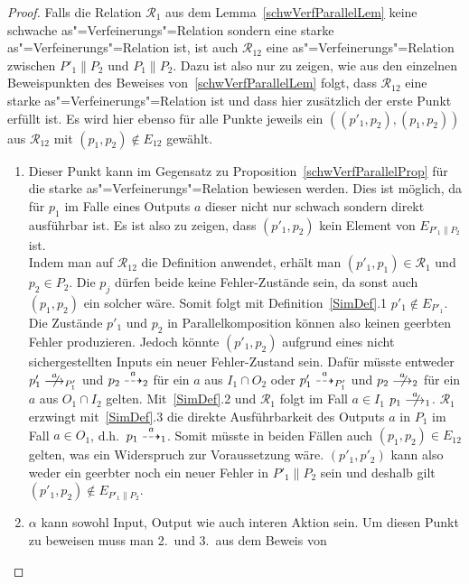 \begin{proof}
  Falls die Relation $\mathcal{R}_1$ aus dem Lemma~\ref{schwVerfParallelLem}
  keine schwache as"=Verfeinerungs"=Relation sondern eine starke
  as"=Verfeinerungs"=Relation ist, ist auch $\mathcal{R}_{12}$ eine
  as"=Verfeinerungs"=Relation zwischen $P'_1\|P_2$ und $P_1\|P_2$. Dazu ist
  also nur zu zeigen, wie aus den einzelnen Beweispunkten des Beweises
  von~\ref{schwVerfParallelLem} folgt, dass $\mathcal{R}_{12}$ eine starke
  as"=Verfeinerungs"=Relation ist und dass hier zusätzlich der erste Punkt
  erfüllt ist. Es wird hier ebenso für alle Punkte jeweils ein
  $((p'_1,p_2),(p_1,p_2))$ aus $\mathcal{R}_{12}$ mit $(p_1,p_2)\notin E_{12}$
  gewählt.
  \begin{enumerate}
    \item Dieser Punkt kann im Gegensatz zu
      Proposition~\ref{schwVerfParallelProp} für die starke
      as"=Verfeinerungs"=Relation bewiesen werden. Dies ist möglich, da für
      $p_1$ im Falle eines Outputs $a$ dieser nicht nur schwach sondern direkt
      ausführbar ist. Es ist also zu zeigen, dass $(p'_1,p_2)$ kein Element von
      $E_{P'_1\|P_2}$ ist.\\
      Indem man auf $\mathcal{R}_{12}$ die Definition anwendet, erhält man
      $(p'_1,p_1)\in\mathcal{R}_1$ und $p_2\in P_2$. Die $p_j$ dürfen beide
      keine Fehler-Zustände sein, da sonst auch $(p_1,p_2)$ ein solcher wäre.
      Somit folgt mit Definition~\ref{SimDef}.1 $p'_1\notin E_{P'_1}$. Die
      Zustände $p'_1$ und $p_2$ in Parallelkomposition können also keinen
      geerbten Fehler produzieren. Jedoch könnte $(p'_1,p_2)$ aufgrund eines
      nicht sichergestellten Inputs ein neuer Fehler-Zustand sein. Dafür müsste
      entweder $p'_1 \nmust[a]_{P'_1}$ und $p_2\may[a]_2$ für ein $a$ aus
      $I_1\cap O_2$ oder $p'_1\may[a]_{P'_1}$ und $p_2\nmust[a]_2$ für ein $a$
      aus $O_1\cap I_2$ gelten. Mit~\ref{SimDef}.2 und $\mathcal{R}_1$ folgt im
      Fall $a\in I_1$ $p_1 \nmust[a]_1$. $\mathcal{R}_1$ erzwingt
      mit~\ref{SimDef}.3 die direkte Ausführbarkeit des Outputs $a$ in $P_1$ im
      Fall $a\in O_1$, d.h.\ $p_1 \may[a]_1$. Somit müsste in beiden Fällen
      auch $(p_1,p_2)\in E_{12}$ gelten, was ein Widerspruch zur Voraussetzung
      wäre. $(p'_1,p'_2)$ kann also weder ein geerbter noch ein neuer Fehler in
      $P'_1\|P_2$ sein und deshalb gilt $(p'_1,p_2) \notin E_{P'_1\|P_2}$.
    \item $\alpha$ kann sowohl Input, Output wie auch interen Aktion sein. Um
      diesen Punkt zu beweisen muss man 2.\ und 3.\ aus dem Beweis von

\end{enumerate}
\end{proof}
